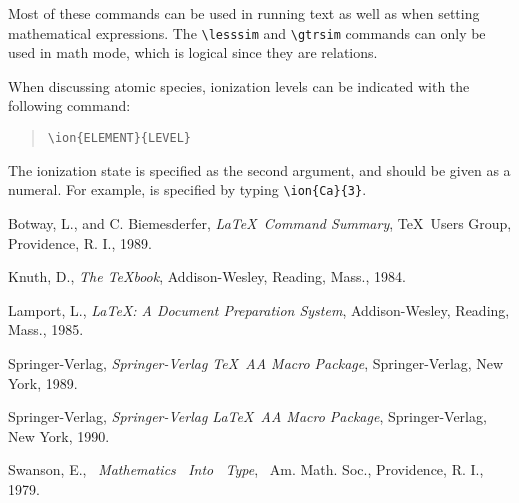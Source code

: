 \begin{article}
Most of these commands can be used in running text as 
well as when setting mathematical expressions.  The 
\verb"\lesssim" and \verb"\gtrsim" commands can only 
be used in math mode, which is logical since they are 
relations.

When discussing atomic species, ionization levels 
can be indicated with the following command:
\begin{quote}
\verb"\ion{ELEMENT}{LEVEL}"
\end{quote}
The ionization state is specified as the second 
argument, and should be given as a numeral.
For example,  is specified by typing 
\verb"\ion{Ca}{3}".

\begin{references}
   Botway, L., and C. Biemesderfer, 
   {\it \LaTeX\ Command Summary},
   \TeX\ Users Group, Providence, R. I., 1989.
 
   Knuth, D., {\it The \TeX book}, 
   Addison-Wesley, Reading, Mass., 1984.

   Lamport, L., 
   {\it \LaTeX: A Document Preparation System\/},
   Addison-Wesley, Reading, Mass., 1985.

   Springer-Verlag, 
   {\it Springer-Verlag \TeX\ AA Macro Package}, 
   Springer-Verlag, New York, 1989.

   Springer-Verlag, 
   {\it Springer-Verlag \LaTeX\ AA Macro Package}, 
   Springer-Verlag, New York, 1990.

   Swanson, E., \, 
   {\it Mathematics \, Into \, Type}, \,
   Am. Math. Soc., Providence, R. I., 1979.
\end{references}
\end{article}

\clearpage
\setcounter{table}{0}


